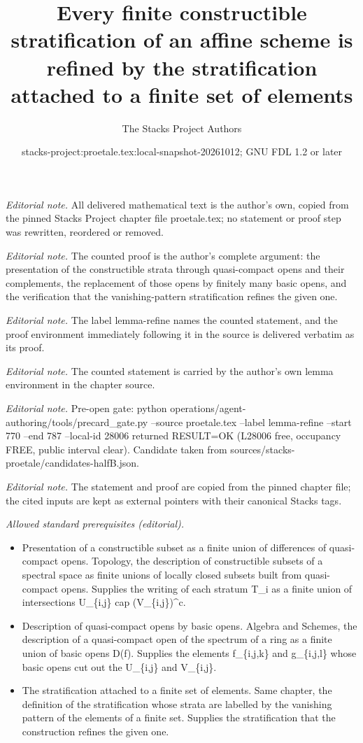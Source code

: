 \documentclass[10pt,a4paper]{amsart}
\title{Every finite constructible stratification of an affine scheme is refined by the stratification attached to a finite set of elements}
\author{The Stacks Project Authors}
\date{stacks-project:proetale.tex:local-snapshot-20261012; GNU FDL 1.2 or later}
\theoremstyle{plain}
\theoremstyle{definition}
\theoremstyle{remark}
\numberwithin{equation}{subsection}
\begin{document}
\maketitle
\noindent\textit{Editorial note.} All delivered mathematical text is the author's own, copied from the pinned Stacks Project chapter file proetale.tex; no statement or proof step was rewritten, reordered or removed.\par\medskip
\noindent\textit{Editorial note.} The counted proof is the author's complete argument: the presentation of the constructible strata through quasi-compact opens and their complements, the replacement of those opens by finitely many basic opens, and the verification that the vanishing-pattern stratification refines the given one.\par\medskip
\noindent\textit{Editorial note.} The label lemma-refine names the counted statement, and the proof environment immediately following it in the source is delivered verbatim as its proof.\par\medskip
\noindent\textit{Editorial note.} The counted statement is carried by the author's own lemma environment in the chapter source.\par\medskip
\noindent\textit{Editorial note.} Pre-open gate: python operations/agent-authoring/tools/precard\_gate.py --source proetale.tex --label lemma-refine --start 770 --end 787 --local-id 28006 returned RESULT=OK (L28006 free, occupancy FREE, public interval clear). Candidate taken from sources/stacks-proetale/candidates-halfB.json.\par\medskip
\noindent\textit{Editorial note.} The statement and proof are copied from the pinned chapter file; the cited inputs are kept as external pointers with their canonical Stacks tags.\par\medskip
\noindent\textit{Allowed standard prerequisites (editorial).}\begin{itemize}
\item Presentation of a constructible subset as a finite union of differences of quasi-compact opens. Topology, the description of constructible subsets of a spectral space as finite unions of locally closed subsets built from quasi-compact opens. Supplies the writing of each stratum T\_i as a finite union of intersections U\_\{i,j\} cap (V\_\{i,j\})\textasciicircum{}c.
\item Description of quasi-compact opens by basic opens. Algebra and Schemes, the description of a quasi-compact open of the spectrum of a ring as a finite union of basic opens D(f). Supplies the elements f\_\{i,j,k\} and g\_\{i,j,l\} whose basic opens cut out the U\_\{i,j\} and V\_\{i,j\}.
\item The stratification attached to a finite set of elements. Same chapter, the definition of the stratification whose strata are labelled by the vanishing pattern of the elements of a finite set. Supplies the stratification that the construction refines the given one.
\end{itemize}\medskip
\end{document}
